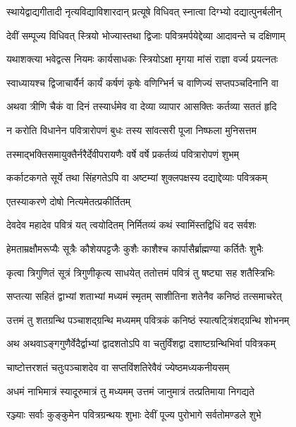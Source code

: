 \twolineshloka
{स्थायेद्वाद्यगीतादी नृत्यविद्याविशारदान्}
{प्रत्यूषे विधिवत् स्नात्वा दिग्भ्यो दद्यात्पुनर्बलीन्} %

\twolineshloka
{देवीं सम्पूज्य विधिवत् स्त्रियो भोज्यास्तथा द्विजाः}
{पवित्रमर्पयेद्देव्या आदावन्ते च दक्षिणाम्} %

\twolineshloka
{यथाशक्त्या भवेद्वत्स नियमः कार्यसाधकः}
{स्त्रियोऽक्षा मृगया मांसं राज्ञा वर्ज्य प्रयत्नतः} %

\twolineshloka
{स्वाध्यायश्च द्विजाचार्यैर्न कार्यं कर्षणं कृषेः}
{वणिग्भिर्न च वाणिज्यं सप्तपञ्चदिनानि वा} %

\twolineshloka
{अथवा त्रीणि चैकं वा दिनं तस्यार्धमेव वा}
{देव्या व्यापार आसक्तिः कर्तव्या सततं हृदि} %

\twolineshloka
{न करोति विधानेन पवित्रारोपणं बुधः}
{तस्य सांवत्सरी पूजा निष्फला मुनिसत्तम} %

\twolineshloka
{तस्माद्भक्तिसमायुक्तैर्नरैर्देवीपरायणैः}
{वर्षे वर्षे प्रकर्तव्यं पवित्रारोपणं शुभम्} %

\twolineshloka
{कर्काटकगते सूर्ये तथा सिंहगतेऽपि वा}
{अष्टम्यां शुक्लपक्षस्य दद्याद्देव्याः पवित्रकम्} %

\onelineshloka
{एतस्याकरणे दोषो नित्यमेतत्प्रकीर्तितम्} %


\twolineshloka
{देवदेव महादेव पवित्रं यत् त्वयोदितम्}
{निर्मितव्यं कथं स्वामिंस्तद्विधिं वद सर्वशः} %


\twolineshloka
{हेमताम्रक्षौमरूप्यैः सूत्रैः कौशेयपट्टजैः}
{कुशैः काशैश्च कार्पासैर्ब्राह्मण्या कर्तितैः शुभैः} %

\twolineshloka
{कृत्वा त्रिगुणितं सूत्रं त्रिगुणीकृत्य साधयेत्}
{ततोत्तमं पवित्रं तु षष्ट्या सह शतैस्त्रिभिः} %

\twolineshloka
{सप्तत्या सहितं द्वाभ्यां शताभ्यां मध्यमं स्मृतम्}
{साशीतिना शतेनैव कनिष्ठं तत्समाचरेत्} %

\twolineshloka
{उत्तमं तु शतग्रन्थि पञ्चाशद्ग्रन्थि मध्यमम्}
{पवित्रकं कनिष्ठं स्यात्षट्त्रिंशद्ग्रन्थि शोभनम्} %

\twolineshloka
{अथ अथवाऽङ्गगुणैर्वेदैर्द्वाभ्यां द्वादशतोऽपि वा}
{चतुर्विंशद्वा दशाष्टग्रन्थिभिर्वा पवित्रकम्} %

\twolineshloka
{चाष्टोत्तरशतं चतुःपञ्चाशदेव वा}
{सप्तविंशतिरेवैवं ज्येष्ठमध्यकनीयसम्} %

\twolineshloka
{अधमं नाभिमात्रं स्यादूरुमात्रं तु मध्यमम्}
{उत्तमं जानुमात्रं तत्प्रतिमाया निगद्यते} %

\twolineshloka
{रञ्ज्याः सर्वाः कुङ्कुमेन पवित्रग्रन्थयः शुभाः}
{देवीं पूज्य पुरोभागे सर्वतोमण्डले शुभे} %

